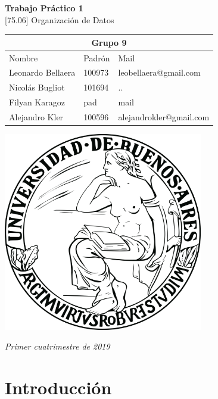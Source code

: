 \documentclass[titlepage,a4paper]{article}
\begin{document}
\begin{titlepage} %
    \centering
    \vfill
    \Huge \textbf{Trabajo Práctico 1} \\
    
    \vskip1cm
    \Huge [75.06] Organización de Datos\\
    \vskip2cm
    \begin{table}[htbp]
	\begin{center}
	\begin{adjustbox}{max width=\textwidth}
	\begin{tabular}{|l|l|l|}
	\hline
    \multicolumn{3}{|c|}{Grupo 9} \\ \hline
	Nombre & Padrón & Mail \\ \hline 
    Leonardo Bellaera & 100973 & leobellaera@gmail.com \\ \hline 
    Nicolás Bugliot & 101694  & .. \\ \hline
    Filyan Karagoz &  pad & mail \\ \hline
    Alejandro Kler & 100596 & alejandrokler@gmail.com \\ \hline
    \end{tabular}
    \end{adjustbox}
    \vskip 2cm
    \includegraphics[width=8.7cm, height=8.7cm]{UBA.png}
	\label{tabla:sencilla}
	\end{center}
	\end{table}
	\vskip1cm
	\Large \textit{Primer cuatrimestre de 2019}

    \vfill
\end{titlepage}
\tableofcontents %
\newpage

\section{Introducción}\label{sec:intro}
\end{document}
